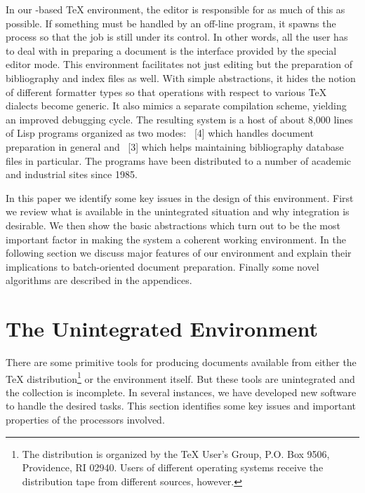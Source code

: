 In our {\emacs}-based {\TeX} environment, the editor is responsible for
as much of this as possible.  If something must be handled by an off-line
program, it spawns the process so that the job is still under its control.
In other words, all the user has to deal with in preparing a document is the
interface provided by the special editor mode.  This environment
facilitates not just editing but the preparation of bibliography and
index files as well.
With simple abstractions, it hides the notion of different formatter types
so that operations with respect to various {\TeX} dialects become
generic.  It also mimics a separate compilation scheme, yielding an
improved debugging cycle.  The resulting system is a host of 
about 8,000 lines of Lisp programs 
organized as two {\emacs} modes: {\TM}~[4] which handles document
preparation in general and {\BM}~[3] which helps maintaining
bibliography database files in particular.
The programs have been distributed to a number of academic and industrial
sites since 1985.

In this paper we identify some key issues in the design of
this environment.
First we review what is available in the unintegrated situation and
why integration is desirable.
We then show the basic abstractions
which turn out to be the most important factor in making the system
a coherent working environment.
In the following section we discuss major features of our environment
and explain their implications to batch-oriented document preparation.
Finally some novel algorithms are described in the appendices.

\section{The Unintegrated Environment}
There are some primitive tools for producing documents available from either
the {\unix} {\TeX} distribution\footnote{The distribution is organized by
the {\TeX} User's Group, P.O. Box 9506, Providence, RI 02940.  Users of
different operating systems receive the distribution tape from different
sources, however.} or the {\unix} environment itself.
But these tools are unintegrated and the collection is incomplete.
In several instances, we have developed new software to handle
the desired tasks.
This section identifies some key issues
and important properties of the processors involved.


